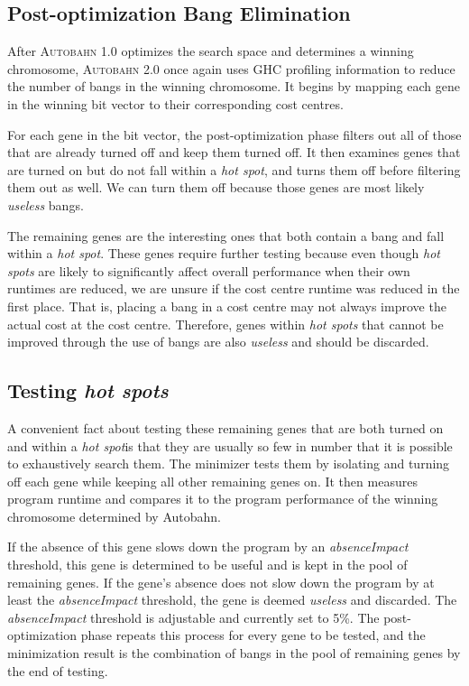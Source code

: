 \documentclass[format=sigplan]{acmart}
\newcommand{\hotspot}[0]{\textit{hot spot}}
\newcommand{\hotspots}[0]{\textit{hot spots}}
\newcommand{\useless}[0]{\textit{useless}}
\newcommand{\Ao}[0]{\textsc{Autobahn 1.0}}
\newcommand{\At}[0]{\textsc{Autobahn 2.0}}
\newcommand{\postopt}[0]{post-optimization}
\newcommand{\Postopt}[0]{Post-optimization}
\newcommand{\absim}[0]{\textit{absenceImpact}}
\begin{document}
\subsection{\Postopt{} Bang Elimination}

After \Ao{} optimizes the search space and determines a winning chromosome, \At{} once again uses GHC profiling information to reduce the number of bangs in the winning chromosome. It begins by mapping each gene in the winning bit vector to their corresponding cost centres. 

For each gene in the bit vector, the \postopt{} phase filters out all of those that are already turned off and keep them turned off. It then examines genes that are turned on but do not fall within a \hotspot{}, and turns them off before filtering them out as well. We can turn them off because those genes are most likely \useless{} bangs. 

The remaining genes are the interesting ones that both contain a bang and fall within a \hotspot{}. These genes require further testing because even though \hotspots{} are likely to significantly affect overall performance when their own runtimes are reduced, we are unsure if the cost centre runtime was reduced in the first place. That is, placing a bang in a cost centre may not always improve the actual cost at the cost centre. Therefore, genes within \hotspots{} that cannot be improved through the use of bangs are also \useless{} and should be discarded.

\subsection{Testing \hotspots{}}
 
A convenient fact about testing these remaining genes that are both turned on and within a \hotspot is that they are usually so few in number that it is possible to exhaustively search them. The minimizer tests them by isolating and turning off each gene while keeping all other remaining genes on. It then measures program runtime and compares it to the program performance of the winning chromosome determined by Autobahn. 

If the absence of this gene slows down the program by an \absim{} threshold, this gene is determined to be useful and is kept in the pool of remaining genes. If the gene's absence does not slow down the program by at least the \absim{} threshold, the gene is deemed \useless{} and discarded. The \absim{} threshold is adjustable and currently set to 5\%. The \postopt{} phase repeats this process for every gene to be tested, and the minimization result is the combination of bangs in the pool of remaining genes by the end of testing.
\end{document}
